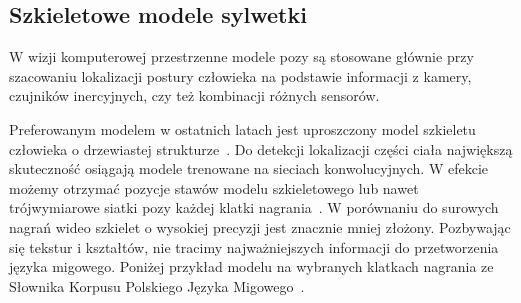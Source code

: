 \subsection{Szkieletowe modele sylwetki}
\label{subsec:skeletal-models}

W wizji komputerowej przestrzenne modele pozy są stosowane głównie przy szacowaniu lokalizacji postury człowieka na podstawie informacji z kamery, czujników inercyjnych, czy też kombinacji różnych sensorów.

Preferowanym modelem w ostatnich latach jest uproszczony model szkieletu człowieka o drzewiastej strukturze~\cite{dafnis2022}. Do detekcji lokalizacji części ciała największą skuteczność osiągają modele trenowane na sieciach konwolucyjnych. W efekcie możemy otrzymać pozycje stawów modelu szkieletowego lub nawet trójwymiarowe siatki pozy każdej klatki nagrania~\cite{choi2020}. W porównaniu do surowych nagrań wideo szkielet o wysokiej precyzji jest znacznie mniej złożony. Pozbywając się tekstur i kształtów, nie tracimy najważniejszych informacji do przetworzenia języka migowego. Poniżej przykład modelu na wybranych klatkach nagrania ze Słownika Korpusu Polskiego Języka Migowego~\cite{lacheta2016}.

